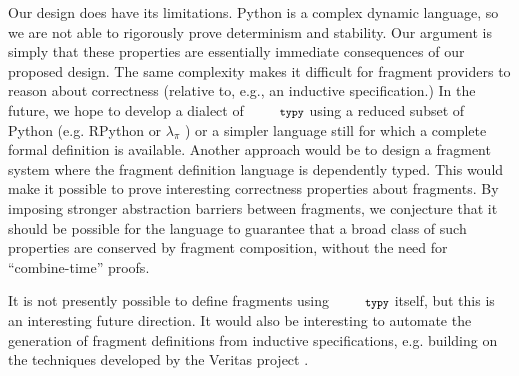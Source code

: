 \documentclass[10pt]{sigplanconf}
\newcommand{\typy}{\texttt{\footnotesize typy}}
\begin{document}

Our design does have its limitations. Python is a complex dynamic language, so we are not able to rigorously prove determinism and stability. Our argument is simply that these properties are essentially immediate consequences of our proposed design. The same complexity makes it difficult for fragment providers to reason about correctness (relative to, e.g., an inductive specification.) 
In the future, we hope to develop a dialect of $\typy$ using a reduced subset of Python (e.g. RPython \cite{ancona2007rpython} or $\lambda_\pi$ \cite{Politz:2013:PFM:2509136.2509536}) or a simpler language still for which a complete formal definition is available. Another approach would be to design a fragment system where the fragment definition language is dependently typed. This would make it possible to prove interesting correctness properties about fragments. By imposing stronger abstraction barriers between fragments, we conjecture that it should be possible for the language to guarantee that a broad class of such properties are conserved by fragment composition, without the need for ``combine-time'' proofs. 

It is not presently possible to define fragments using $\typy$ itself, but this is an interesting future direction. It would also be interesting to automate the generation of fragment definitions from inductive specifications, e.g. building on the techniques developed by the Veritas project \cite{grewe2015type}. 


\end{document}
